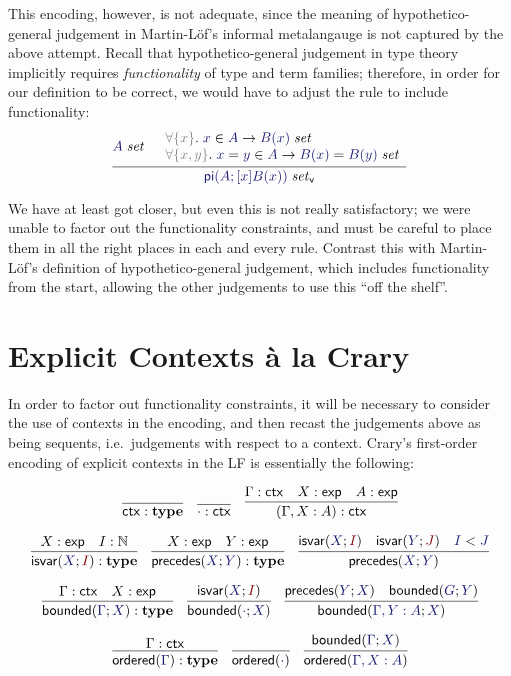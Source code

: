 \documentclass[acmtoplas]{acmtrans2m}
\def\InputModeColorName{MidnightBlue}
\def\OutputModeColorName{Maroon}
\newcommand\InputMode[1]{{\color{\InputModeColorName}{#1}}}
\newcommand\OutputMode[1]{{\color{\OutputModeColorName}{#1}}}
\newcommand\naturals{\mathbb{N}}
\newcommand\type{\mathbf{type}}
\newcommand\sortexp{\mathsf{exp}}
\newcommand\sortctx{\mathsf{ctx}}
\newcommand\isset[1]{\InputMode{#1}\;\mathit{set}}
\newcommand\eqset[2]{\InputMode{#1}=\InputMode{#2}\;\mathit{set}}
\newcommand\mem[2]{\InputMode{#1}\in\InputMode{#2}}
\newcommand\eqmem[3]{\InputMode{#1}=\InputMode{#2}\in\InputMode{#3}}
\newcommand\canset[1]{\InputMode{#1}\;\mathit{set}_\mathsf{v}}
\newcommand\lfpi[2]{{\color{Gray}\forall\{#1\}}.\;#2}
\DeclareMathOperator{\typi}{\mathsf{pi}}
\DeclareMathOperator\isvarop{\mathsf{isvar}}
\DeclareMathOperator\boundedop{\mathsf{bounded}}
\DeclareMathOperator\orderedop{\mathsf{ordered}}
\DeclareMathOperator\precedesop{\mathsf{precedes}}
\newcommand\isvar[2]{\isvarop(\InputMode{#1};\OutputMode{#2})}
\newcommand\bounded[2]{\boundedop(\InputMode{#1};\InputMode{#2})}
\newcommand\ordered[1]{\orderedop(\InputMode{#1})}
\newcommand\precedes[2]{\precedesop(\InputMode{#1};\InputMode{#2})}
\newcommand\lessthan[2]{\InputMode{#1}<\InputMode{#2}}
\begin{document}
This encoding, however, is not adequate, since the meaning of
hypothetico-general judgement in Martin-L\"of's informal metalangauge is not
captured by the above attempt. Recall that hypothetico-general judgement in
type theory implicitly requires \emph{functionality} of type and term families;
therefore, in order for our definition to be correct, we would have to adjust
the rule to include functionality:
\[
  \infer{
    \canset{\typi(A;[x]B(x))}
  }{
    \isset{A} &
    \begin{array}{l}
      \lfpi{x}\mem{x}{A}\to\isset{B(x)}\\
      \lfpi{x,y}\eqmem{x}{y}{A}\to\eqset{B(x)}{B(y)}\\
    \end{array}
  }
\]

We have at least got closer, but even this is not really satisfactory; we were
unable to factor out the functionality constraints, and must be careful to
place them in all the right places in each and every rule. Contrast this with
Martin-L\"of's definition of hypothetico-general judgement, which includes
functionality from the start, allowing the other judgements to use this ``off
the shelf''.

\section{Explicit Contexts \`a la Crary}
In order to factor out functionality constraints, it will be necessary to
consider the use of contexts in the encoding, and then recast the judgements
above as being sequents, i.e.\ judgements with respect to a context. Crary's
first-order encoding of explicit contexts in the LF is essentially the
following:

\begin{gather*}
  \infer{\sortctx:\type}{}
  \quad
  \infer{\cdot:\sortctx}{}
  \quad
  \infer{
    (\Gamma,X:A):\sortctx
  }{
    \Gamma:\sortctx &
    X:\sortexp &
    A:\sortexp
  }\\[6pt]
  \infer{
    \isvar{X}{I} : \type
  }{
    X:\sortexp &
    I:\naturals
  }
  \quad
  \infer{
    \precedes{X}{Y}: \type
  }{
    X:\sortexp &
    Y:\sortexp
  }\quad
  \infer{
    \precedes{X}{Y}
  }{
    \isvar{X}{I} &
    \isvar{Y}{J} &
    \lessthan{I}{J}
  }\\[6pt]
  \infer{
    \bounded{\Gamma}{X}:\type
  }{
    \Gamma:\sortctx &
    X:\sortexp
  }
  \quad
  \infer{
    \bounded{\cdot}{X}
  }{
    \isvar{X}{I}
  }
  \quad
  \infer{
    \bounded{\Gamma,Y:A}{X}
  }{
    \precedes{Y}{X} &
    \bounded{G}{Y}
  }
  \\[6pt]
  \infer{
    \ordered\Gamma:\type
  }{
    \Gamma:\sortctx
  }
  \quad
  \infer{\ordered\cdot}{}
  \quad
  \infer{
    \ordered{\Gamma,X:A}
  }{
    \bounded{\Gamma}{X}
  }
  \\[6pt]
\end{gather*}
\end{document}
